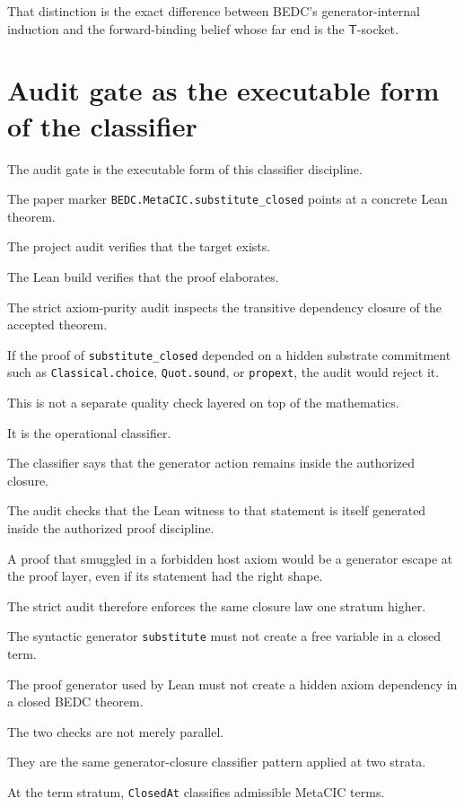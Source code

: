 That distinction is the exact difference between BEDC's generator-internal
induction and the forward-binding belief whose far end is the $\mathsf{T}$-socket.

\section{Audit gate as the executable form of the classifier}
\label{sec:closed-term-substitution-audit-gate}

The audit gate is the executable form of this classifier discipline.

The paper marker \texttt{BEDC.MetaCIC.substitute\_closed}
points at a concrete Lean theorem.

The project audit verifies that the target exists.

The Lean build verifies that the proof elaborates.

The strict axiom-purity audit inspects the transitive dependency closure of the
accepted theorem.

If the proof of \texttt{substitute\_closed} depended on a hidden substrate
commitment such as \texttt{Classical.choice}, \texttt{Quot.sound}, or
\texttt{propext}, the audit would reject it.

This is not a separate quality check layered on top of the mathematics.

It is the operational classifier.

The classifier says that the generator action remains inside the authorized
closure.

The audit checks that the Lean witness to that statement is itself generated
inside the authorized proof discipline.

A proof that smuggled in a forbidden host axiom would be a generator escape at
the proof layer, even if its statement had the right shape.

The strict audit therefore enforces the same closure law one stratum higher.

The syntactic generator \texttt{substitute} must not create a free variable in a
closed term.

The proof generator used by Lean must not create a hidden axiom dependency in a
closed BEDC theorem.

The two checks are not merely parallel.

They are the same generator-closure classifier pattern applied at two strata.

At the term stratum, \texttt{ClosedAt} classifies admissible MetaCIC terms.

